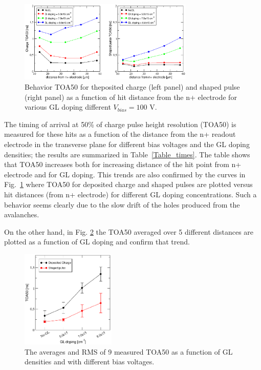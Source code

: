 \documentclass[aps,pt14,superscriptaddress,showpacs,floatfix,nofootinbib]{revtex4}
\begin{document}
\begin{figure}[hbtp]
\begin{center}
\includegraphics[width=0.74\textwidth,keepaspectratio]{figures1/ToA50_vs_distance.pdf}
\caption{Behavior TOA50 for theposited charge (left panel) and shaped pulse (right panel) as a function of hit distance from the n+ electrode for various GL doping different $V_{bias}=100$ V.~\label{fig:toarms1}}
\end{center}
\end{figure}


The timing of arrival at 50\% of charge pulse height resolution (TOA50) is measured for these hits 
as a function of the distance from the n+ readout electrode in the transverse plane for different bias voltages and the GL doping densities; the results are summarized in Table~\ref{Table_times}. The table shows that TOA50 increases both for increasing distance of the hit point from n+ electrode and for GL doping. This trends are also confirmed by the curves in Fig.~\ref{fig:toarms1} where TOA50 for deposited charge and shaped pulses are plotted versus hit distances (from n+ electrode) for different GL doping concentrations. Such a behavior seems clearly due to the slow drift of the holes produced from the avalanches.  

On the other hand, in Fig. \ref{fig:toarms2} the TOA50 averaged over 5 different distances are plotted as a function of GL doping and confirm that trend.


\begin{figure}[hbtp]
\begin{center}
\includegraphics[width=0.40\textwidth,keepaspectratio]{figures1/ToA50_vs_GLdoping.pdf}
\caption{The averages and RMS of 9 measured TOA50 as a function of GL densities and with different bias 
voltages.~\label{fig:toarms2}}
\end{center}
\end{figure}
\end{document}
